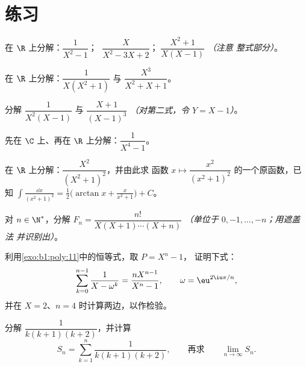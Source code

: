 \section{练习}

\begin{exercise}[$\star$]\label{exo:b1:fractions:1}
在 $\R$ 上分解：$\dfrac{1}{X^2 - 1}$；
$\;\dfrac{X}{X^2 - 3X + 2}$；$\;\dfrac{X^2 + 1}{X(X-1)}$ \emph{（注意
整式部分）}。
\end{exercise}

\begin{exercise}[$\star$]\label{exo:b1:fractions:2}
在 $\R$ 上分解：$\dfrac{1}{X(X^2 + 1)}$ 与
$\dfrac{X^3}{X^2 + X + 1}$。
\end{exercise}

\begin{exercise}[$\star$]\label{exo:b1:fractions:3}
分解 $\dfrac{1}{X^2(X - 1)}$ 与 $\dfrac{X + 1}{(X - 1)^3}$
\emph{（对第二式，令 $Y = X - 1$）}。
\end{exercise}

\begin{exercise}[$\star\star$]\label{exo:b1:fractions:4}
先在 $\C$ 上、再在 $\R$ 上分解：$\dfrac{1}{X^4 - 1}$。
\end{exercise}

\begin{exercise}[$\star\star$]\label{exo:b1:fractions:5}
在 $\R$ 上分解：$\dfrac{X^2}{(X^2 + 1)^2}$，并由此求
函数 $x \mapsto \dfrac{x^2}{(x^2+1)^2}$ 的一个原函数，已知
$\int \frac{\dd x}{(x^2+1)^2} = \frac12\bigl(\arctan x +
\frac{x}{x^2+1}\bigr) + C$。
\end{exercise}

\begin{exercise}[$\star\star$]\label{exo:b1:fractions:6}
对 $n \in \N^*$，分解 $F_n = \dfrac{n!}{X(X+1)\cdots(X+n)}$
\emph{（单位于 $0, -1, \dots, -n$；用遮盖法
并识别出）}。
\end{exercise}

\begin{exercise}[$\star\star$]\label{exo:b1:fractions:7}
利用\cref{exo:b1:poly:11}中的恒等式，取 $P = X^n - 1$，
证明下式：
\[
\sum_{k=0}^{n-1} \frac{1}{X - \omega^k} = \frac{n X^{n-1}}{X^n - 1},
\qquad \omega = \eu^{2\iu\pi/n},
\]
并在 $X = 2$、$n = 4$ 时计算两边，以作检验。
\end{exercise}

\begin{exercise}[$\star\star$]\label{exo:b1:fractions:8}
分解 $\dfrac{1}{k(k+1)(k+2)}$，并计算
\[
S_n = \sum_{k=1}^{n} \frac{1}{k(k+1)(k+2)},
\qquad\text{再求}\qquad
\lim_{n \to \infty} S_n .
\]
\end{exercise}

